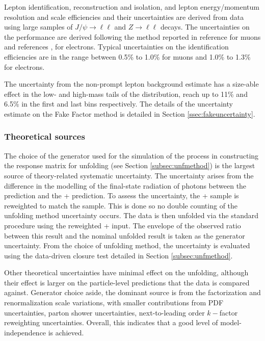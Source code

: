Lepton identification, reconstruction and isolation, and lepton energy/momentum resolution and scale efficiencies and their uncertainties are derived from data using large samples of $J/\psi\rightarrow\ell\ell$ and $Z\rightarrow\ell\ell$ decays. The uncertainties on the performance are derived following the method reported in reference \cite{ATLAS_muon_reco_2016} for muons and references \cite{ATLAS_electron_efficiency_2015-2017}, \cite{ATLAS_electron_efficiency_2015-2016} for electrons. Typical uncertainties on the identification efficiencies are in the range between 0.5\% to 1.0\% for muons and 1.0\% to 1.3\% for electrons. 

The uncertainty from the non-prompt lepton background estimate has a size-able effect in the low- and high-mass tails of the \mFourL{} distribution, reach up to 11\% and 6.5\% in the first and last bins respectively. The details of the uncertainty estimate on the Fake Factor method is detailed in Section \ref{ssec:fakeuncertainty}.

\subsubsection{Theoretical sources}
The choice of the generator used for the simulation of the \qqFourL{} process in constructing the response matrix for unfolding (see Section \ref{subsec:unfmethod}) is the largest source of theory-related systematic uncertainty. The uncertainty arises from the difference in the modelling of the final-state radiation of photons between the \SHERPA{} prediction and the \POWHEG{} + \pythia{} prediction. To assess the uncertainty, the \POWHEG{} + \pythia{} sample is reweighted to match the \SHERPA{} sample. This is done so no double counting of the unfolding method uncertainty occurs. The data is then unfolded via the standard procedure using the reweighted \POWHEG{} + \pythia{} input. The envelope of the observed ratio between this result and the nominal unfolded result is taken as the generator uncertainty. From the choice of unfolding method, the uncertainty is evaluated using the data-driven closure test detailed in Section \ref{subsec:unfmethod}. 

Other theoretical uncertainties have minimal effect on the unfolding, although their effect is larger on the particle-level predictions that the data is compared against. Generator choice aside, the dominant source is from the factorization and renormalization scale variations, with smaller contributions from PDF uncertainties, parton shower uncertainties, next-to-leading order $k-$factor reweighting uncertainties. Overall, this indicates that a good level of model-independence is achieved.

